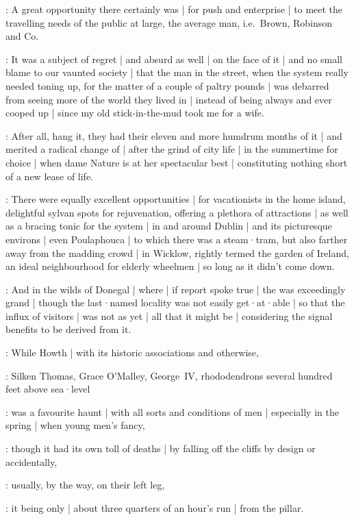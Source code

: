 :
A great opportunity there certainly was |
for push and enterprise |
to meet the travelling needs of the public at large,
the average man,
i.e.\ Brown,
Robinson and Co.

:
It was a subject of regret |
and absurd as well |
on the face of it |
and no small blame to our vaunted society |
that the man in the street,
when the system really needed toning up,
for the matter of a couple of paltry pounds |
was debarred from seeing more of the world they lived in |
instead of being always and ever cooped up |
since my old stick-in-the-mud took me for a wife.

:
After all,
hang it,
they had their eleven and more humdrum months of it |
and merited a radical change of  |
after the grind of city life |
in the summertime for choice |
when dame Nature is at her spectacular best |
constituting nothing short of a new lease of life.

:
There were equally excellent opportunities |
for vacationists in the home island,
delightful sylvan spots for rejuvenation,
offering a plethora of attractions |
as well as a bracing tonic for the system |
in and around Dublin |
and its picturesque environs |
even Poulaphouca |
to which there was a steam·tram,
but also farther away from the madding crowd |
in Wicklow,
rightly termed the garden of Ireland,
an ideal neighbourhood for elderly wheelmen |
so long as it didn't come down.

:
And in the wilds of Donegal |
where |
if report spoke true |
the  was exceedingly grand |
though the last·named locality was not easily get·at·able |
so that the influx of visitors |
was not as yet |
all that it might be |
considering the signal benefits to be derived from it.

:
While Howth |
with its historic associations and otherwise,

:
Silken Thomas,
Grace O'Malley,
George~IV,
rhododendrons several hundred feet above sea·level

:
was a favourite haunt |
with all sorts and conditions of men |
especially in the spring |
when young men's fancy,

:
though it had its own toll of deaths |
by falling off the cliffs by design or accidentally,

:
usually,
by the way,
on their left leg,

:
it being only |
about three quarters of an hour's run |
from the pillar.

